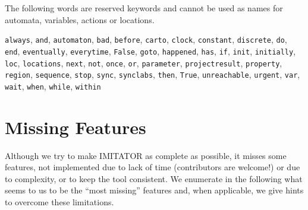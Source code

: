 \documentclass[a4paper,11pt]{report}
\newcommand{\imitator}{\textsf{IMITATOR}}
\newcommand{\styleIMI}[1]{\textcolor{imicolor}{\texttt{#1}}}
\newcommand{\ie}{\textcolor{colorok}{\textit{i.e.}, }}
\begin{document}
The following words are reserved keywords and cannot be used as names for automata, variables, actions or locations. 

\styleIMI{always},
\styleIMI{and},
\styleIMI{automaton},
\styleIMI{bad},
\styleIMI{before},
\styleIMI{carto},
\styleIMI{clock},
\styleIMI{constant},
\styleIMI{discrete},
\styleIMI{do},
\styleIMI{end},
\styleIMI{eventually},
\styleIMI{everytime},
\styleIMI{False},
\styleIMI{goto},
\styleIMI{happened},
\styleIMI{has},
\styleIMI{if},
\styleIMI{init},
\styleIMI{initially},
\styleIMI{loc},
\styleIMI{locations},
\styleIMI{next},
\styleIMI{not},
\styleIMI{once},
\styleIMI{or},
\styleIMI{parameter},
\styleIMI{projectresult},
\styleIMI{property},
\styleIMI{region},
\styleIMI{sequence},
\styleIMI{stop},
\styleIMI{sync},
\styleIMI{synclabs},
\styleIMI{then},
\styleIMI{True},
\styleIMI{unreachable},
\styleIMI{urgent},
\styleIMI{var},
\styleIMI{wait},
\styleIMI{when},
\styleIMI{while},
\styleIMI{within}






\chapter{Missing Features}

Although we try to make \imitator{} as complete as possible, it misses some features, not implemented due to lack of time (contributors are welcome!) or due to complexity, or to keep the tool consistent.
We enumerate in the following what seems to us to be the ``most missing'' features and, when applicable, we give hints to overcome these limitations.


% 
\end{document}
